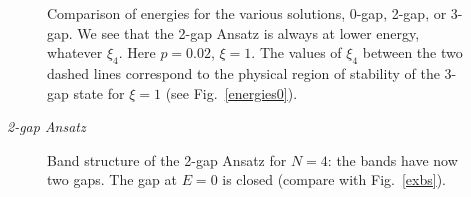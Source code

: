 \documentclass[]{revtex4-1}
\begin{document}
\begin{figure}[h]
  \begin{center}
     \end{center}      \caption{Comparison of energies for the various solutions, 0-gap, 2-gap, or 3-gap. We see that the 2-gap Ansatz is always at lower energy, whatever $\xi_4$. Here $p=0.02$, $\xi=1$. The values of $\xi_4$ between the two dashed lines correspond to the physical region of stability of the 3-gap state for $\xi=1$ (see Fig.~\ref{energies0}).}
  \label{energies}
 \end{figure}


\medskip

\textit{2-gap Ansatz}

\medskip

\begin{figure}[h]
  \begin{center}
                \end{center}     \caption{Band structure of the 2-gap Ansatz for $N=4$: the bands have now two gaps. The gap at $E=0$ is closed (compare with Fig.~\ref{exbs}).}
  \label{bands}
 \end{figure}
\end{document}

